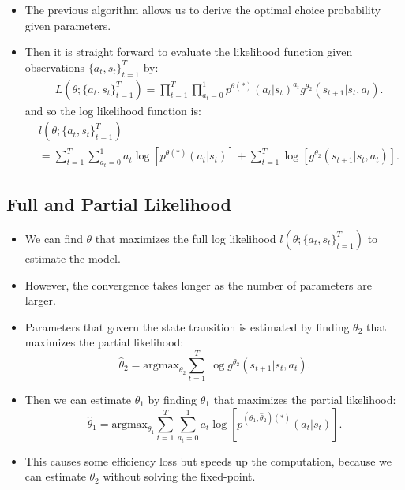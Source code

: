 \documentclass[
]{book}
\providecommand{\tightlist}{%
  \setlength{\itemsep}{0pt}\setlength{\parskip}{0pt}}
\begin{document}
\begin{itemize}
\tightlist
\item
  The previous algorithm allows us to derive the optimal choice probability given parameters.
\item
  Then it is straight forward to evaluate the likelihood function given observations \(\{a_t, s_t\}_{t = 1}^T\) by:
  \begin{equation}
  \begin{split}
  &L(\theta; \{a_t, s_t\}_{t = 1}^T) =\prod_{t = 1}^T \prod_{a_t = 0}^1 p^{\theta (\ast)}(a_t|s_t)^{a_t} g^{\theta_2} (s_{t + 1}|s_t, a_t).
  \end{split}
  \end{equation}
  and so the log likelihood function is:
  \begin{equation}
  \begin{split}
  &l(\theta; \{a_t, s_t\}_{t = 1}^T)\\
  &=\sum_{t = 1}^T \sum_{a_t = 0}^1 a_t \log [p^{\theta (\ast)}(a_t|s_t)] + \sum_{t = 1}^T \log [g^{\theta_2} (s_{t + 1}|s_t, a_t)].
  \end{split}
  \end{equation}
\end{itemize}

\hypertarget{full-and-partial-likelihood}{%
\subsection{Full and Partial Likelihood}\label{full-and-partial-likelihood}}

\begin{itemize}
\tightlist
\item
  We can find \(\theta\) that maximizes the full log likelihood \(l(\theta; \{a_t, s_t\}_{t = 1}^T)\) to estimate the model.
\item
  However, the convergence takes longer as the number of parameters are larger.
\item
  Parameters that govern the state transition is estimated by finding \(\theta_2\) that maximizes the partial likelihood:
  \begin{equation}
  \hat{\theta}_2 = \text{argmax}_{\theta_2} \sum_{t = 1}^T \log g^{\theta_2}(s_{t + 1}|s_t, a_t).
  \end{equation}
\item
  Then we can estimate \(\theta_1\) by finding \(\theta_1\) that maximizes the partial likelihood:
  \begin{equation}
  \hat{\theta}_1 = \text{argmax}_{\theta_1} \sum_{t = 1}^T \sum_{a_t = 0}^1 a_t \log [p^{(\theta_1, \hat{\theta}_2) (\ast)}(a_t|s_t)].
  \end{equation}
\item
  This causes some efficiency loss but speeds up the computation, because we can estimate \(\theta_2\) without solving the fixed-point.
\end{itemize}
\end{document}
